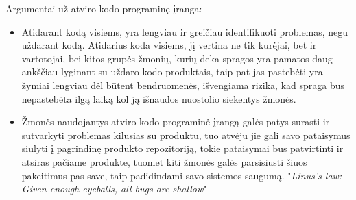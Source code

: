 \documentclass[a4paper,12pt,fleqn]{article}
\begin{document}
Argumentai už atviro kodo programinę įranga:
\begin{itemize}
	\item Atidarant kodą visiems, yra lengviau ir greičiau identifikuoti problemas, negu uždarant kodą. Atidarius koda visiems, jį vertina ne tik kurėjai, bet ir vartotojai, bei kitos grupės žmonių, kurių deka spragos yra pamatos daug ankščiau lyginant su uždaro kodo produktais, taip pat jas pastebėti yra žymiai lengviau dėl būtent bendruomenės, išvengiama rizika, kad spraga bus nepastebėta ilgą laiką kol ją išnaudos nuostolio siekentys žmonės\cite{10.5555/580808}.
	\item Žmonės naudojantys atviro kodo programinė įrangą galės patys surasti ir sutvarkyti problemas kilusias su produktu, tuo atvėju jie gali savo pataisymus siulyti į pagrindinę produkto repozitoriją, tokie pataisymai bus patvirtinti ir atsiras pačiame produkte, tuomet kiti žmonės galės parsisiusti šiuos pakeitimus pas save, taip padidindami savo sistemos saugumą. "\textit{Linus's law: Given enough eyeballs, all bugs are shallow}\cite{Meneely:2009:SOS:1653662.1653717}"
\end{itemize}
\end{document}
